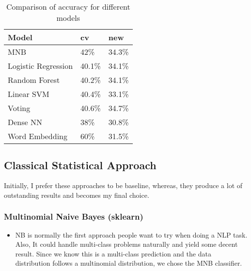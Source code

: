 \documentclass[11pt]{article}
\begin{document}
\begin{table}[h]
  \begin{center}
 \begin{tabular}{|l|l|l|}
 
       \hline
       Model & cv 
       & new\\
       \hline\hline
       MNB & 42\% & 34.3\% \\
       Logistic Regression & 40.1\% & 34.1\% \\
       Random Forest & 40.2\% & 34.1\% \\
       Linear SVM & 40.4\% & 33.1\% \\
       Voting & 40.6\% & 34.7\% \\
       Dense NN & 38\% & 30.8\% \\
       Word Embedding & 60\% & 31.5\% \\
       \hline
 
 \end{tabular}
 \caption{Comparison of accuracy for different models}\label{accuracy}
  \end{center}
 \end{table}


\subsection{Classical Statistical Approach}

Initially, I prefer these approaches to be baseline, 
whereas, they produce a lot of outstanding results and becomes my 
final choice.

\subsubsection{Multinomial Naive Bayes (sklearn)}
\begin{itemize}
      \item 
            NB is normally the first approach people 
            want to try when doing a NLP task. Also, It could handle multi-class
            problems naturally and yield some decent result. Since we know this
            is a multi-class prediction and the data distribution follows a multinomial
            distribution, we chose the MNB classifier.
\end{itemize}
\end{document}
